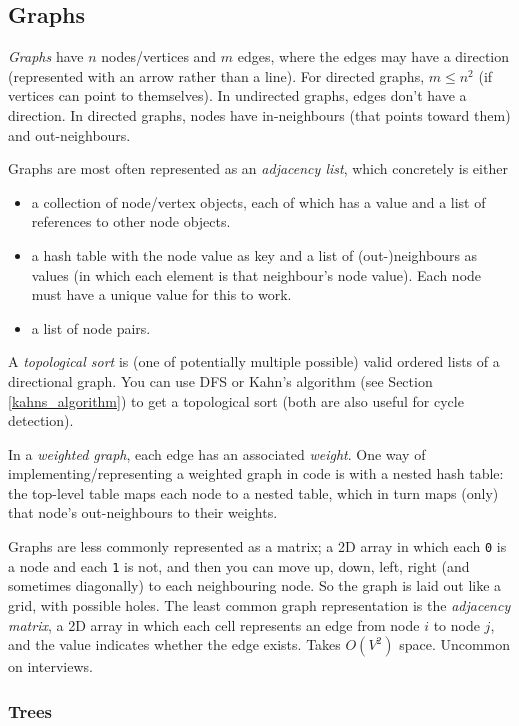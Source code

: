 \documentclass[table, xcdraw]{article}%
\begin{document}
\subsection{Graphs}

\emph{Graphs} have $n$ nodes/vertices and $m$ edges, where the edges may have a direction (represented with an arrow rather than a line). For directed graphs, $m \leq n^2$ (if vertices can point to themselves). In undirected graphs, edges don't have a direction. In directed graphs, nodes have in-neighbours (that points toward them) and out-neighbours.

Graphs are most often represented as an \emph{adjacency list}, which concretely is either

\begin{itemize}
    \item a collection of node/vertex objects, each of which has a value and a list of references to other node objects.
    \item a hash table with the node value as key and a list of (out-)neighbours as values (in which each element is that neighbour's node value). Each node must have a unique value for this to work.
    \item a list of node pairs.
\end{itemize}

A \emph{topological sort} is (one of potentially multiple possible) valid ordered lists of a directional graph. You can use DFS or Kahn's algorithm (see Section \ref{kahns_algorithm}) to get a topological sort (both are also useful for cycle detection).

In a \emph{weighted graph}, each edge has an associated \emph{weight}. One way of implementing/representing a weighted graph in code is with a nested hash table: the top-level table maps each node to a nested table, which in turn maps (only) that node's out-neighbours to their weights.

Graphs are less commonly represented as a matrix; a 2D array in which each \texttt{0} is a node and each \texttt{1} is not, and then you can move up, down, left, right (and sometimes diagonally) to each neighbouring node. So the graph is laid out like a grid, with possible holes. The least common graph representation is the \textit{adjacency matrix}, a 2D array in which each cell represents an edge from node $i$ to node $j$, and the value indicates whether the edge exists. Takes $O(V^2)$ space. Uncommon on interviews.

\subsubsection{Trees}
\end{document}

